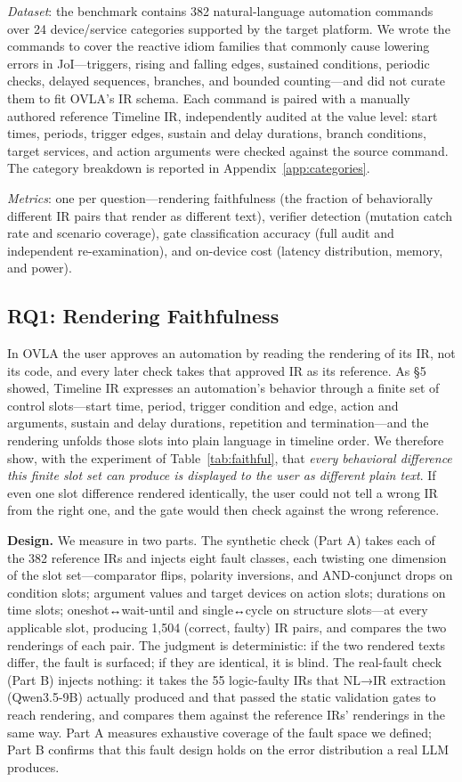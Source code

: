 \documentclass[sigconf,nonacm,anonymous,review]{acmart}
\begin{document}
\emph{Dataset}: the benchmark contains 382 natural-language automation commands over 24 device/service categories supported by the target platform. We wrote the commands to cover the reactive idiom families that commonly cause lowering errors in JoI—triggers, rising and falling edges, sustained conditions, periodic checks, delayed sequences, branches, and bounded counting—and did not curate them to fit OVLA's IR schema. Each command is paired with a manually authored reference Timeline IR, independently audited at the value level: start times, periods, trigger edges, sustain and delay durations, branch conditions, target services, and action arguments were checked against the source command. The category breakdown is reported in Appendix~\ref{app:categories}.

\emph{Metrics}: one per question—rendering faithfulness (the fraction of behaviorally different IR pairs that render as different text), verifier detection (mutation catch rate and scenario coverage), gate classification accuracy (full audit and independent re-examination), and on-device cost (latency distribution, memory, and power).

\subsection{RQ1: Rendering Faithfulness}

In OVLA the user approves an automation by reading the rendering of its IR, not its code, and every later check takes that approved IR as its reference. As \S5 showed, Timeline IR expresses an automation's behavior through a finite set of control slots—start time, period, trigger condition and edge, action and arguments, sustain and delay durations, repetition and termination—and the rendering unfolds those slots into plain language in timeline order. We therefore show, with the experiment of Table~\ref{tab:faithful}, that \emph{every behavioral difference this finite slot set can produce is displayed to the user as different plain text}. If even one slot difference rendered identically, the user could not tell a wrong IR from the right one, and the gate would then check against the wrong reference.

\textbf{Design.} We measure in two parts. The synthetic check (Part A) takes each of the 382 reference IRs and injects eight fault classes, each twisting one dimension of the slot set—comparator flips, polarity inversions, and AND-conjunct drops on condition slots; argument values and target devices on action slots; durations on time slots; oneshot↔wait-until and single↔cycle on structure slots—at every applicable slot, producing 1,504 (correct, faulty) IR pairs, and compares the two renderings of each pair. The judgment is deterministic: if the two rendered texts differ, the fault is surfaced; if they are identical, it is blind. The real-fault check (Part B) injects nothing: it takes the 55 logic-faulty IRs that NL→IR extraction (Qwen3.5-9B) actually produced and that passed the static validation gates to reach rendering, and compares them against the reference IRs' renderings in the same way. Part A measures exhaustive coverage of the fault space we defined; Part B confirms that this fault design holds on the error distribution a real LLM produces.
\end{document}

